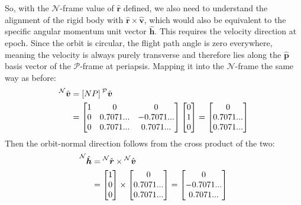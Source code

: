 \documentclass[titlepage]{article}
\begin{document}
So, with the $\mathcal{N}$-frame value of $\hat{\boldsymbol{r}}$ defined, we also need to understand the alignment of the rigid body with $\hat{\boldsymbol{r}}\times\hat{\boldsymbol{v}}$, which would also be equivalent to the specific angular momentum unit vector $\hat{\boldsymbol{h}}$. This requires the velocity direction at epoch. Since the orbit is circular, the flight path angle is zero everywhere, meaning the velocity is always purely transverse and therefore lies along the $\hat{\boldsymbol{p}}$ basis vector of the $\mathcal{P}$-frame at periapsis. Mapping it into the $\mathcal{N}$-frame the same way as before:
\begin{equation}
	\begin{split}
		\prescript{\mathcal{N}}{}{\hat{\boldsymbol{v}}}&=[NP]\prescript{\mathcal{P}}{}{\hat{\boldsymbol{v}}} \\
		&=
		\begin{bmatrix}
			1 & 0 & 0\\
			0 & 0.7071... & -0.7071... \\
			0 & 0.7071... & 0.7071...
		\end{bmatrix}
		\begin{bmatrix}
			0 \\ 1 \\ 0 \\
		\end{bmatrix}
		=
		\begin{bmatrix}
			0 \\ 0.7071... \\ 0.7071... \\
		\end{bmatrix}
	\end{split}
\end{equation}
Then the orbit-normal direction follows from the cross product of the two:
\begin{equation}
	\begin{split}
		\prescript{\mathcal{N}}{}{\hat{\boldsymbol{h}}}&=\prescript{\mathcal{N}}{}{\hat{\boldsymbol{r}}}\times\prescript{\mathcal{N}}{}{\hat{\boldsymbol{v}}} \\
		&=
		\begin{bmatrix}
			1 \\ 0 \\ 0 \\
		\end{bmatrix}\times
		\begin{bmatrix}
			0 \\ 0.7071... \\ 0.7071... \\
		\end{bmatrix} =
		\begin{bmatrix}
			0 \\ -0.7071... \\ 0.7071... \\
		\end{bmatrix}
	\end{split}
\end{equation}
\end{document}
